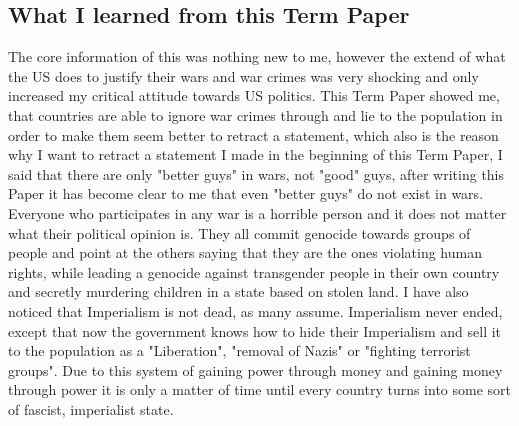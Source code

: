 \subsection{What I learned from this Term Paper}
The core information of this was nothing new to me, however the extend of what the US does to justify their wars and war crimes was very shocking and only increased my critical attitude towards US politics.
This Term Paper showed me, that countries are able to ignore war crimes through and lie to the population in order to make them seem better to retract a statement, which also is the reason why I want to retract a statement I made in the beginning of this Term Paper, I said that there are only "better guys" in wars, not "good" guys, after writing this Paper it has become clear to me that even "better guys" do not exist in wars. Everyone who participates in any war is a horrible person and it does not matter what their political opinion is. They all commit genocide towards groups of people and point at the others saying that they are the ones violating human rights, while leading a genocide against transgender people in their own country and secretly murdering children in a state based on stolen land.
I have also noticed that Imperialism is not dead, as many assume. Imperialism never ended, except that now the government knows how to hide their Imperialism and sell it to the population as a "Liberation", "removal of Nazis" or "fighting terrorist groups".
Due to this system of gaining power through money and gaining money through power it is only a matter of time until every country turns into some sort of fascist, imperialist state.